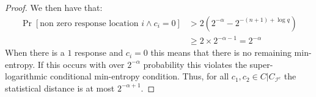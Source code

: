 \documentclass[11pt]{article}
\newcommand{\ngl}{\ensuremath{\mathtt{ngl}}\xspace}
\newcommand{\Hav}{\tilde{\mathrm{H}}_\infty}
\newtheorem{lemma}[theorem]{Lemma}
\newcommand{\authnote}[2]{{\textcolor{red}{\textsf{#1 notes: }\textcolor{blue}{ #2}}\marginpar{\textcolor{red}{\textbf{!!!!!}}}}}
\newcommand{\authnote}[2]{}
\newcommand{\bnote}[1]{{\authnote{Ben}{#1}}}
\begin{document}
\begin{proof}
We then have that:
\begin{align*}
 \Pr[\text{non zero response location }i \wedge c_i=0] &> 2(2^{-\alpha} - 2^{-(n+1) +\log q} )\\
 &\geq 2\times 2^{-\alpha-1}  = 2^{-\alpha}
 \end{align*}
 When there is a $1$ response and $c_i=0$ this means that there is no remaining min-entropy.  If this occurs with over $2^{-\alpha}$ probability this violates the super-logarithmic conditional min-entropy condition.  Thus, for all $c_1, c_2\in C| C_{\mathcal{I}^c}$ the statistical distance is at most $2^{-\alpha+1}$.
\end{proof}

\end{document}
